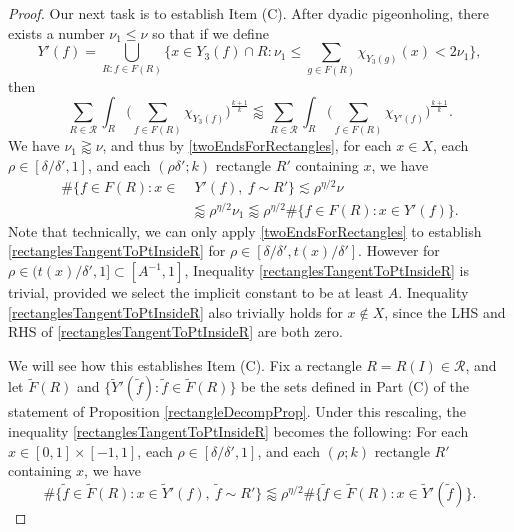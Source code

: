 \documentclass[letterpaper, reqno,11pt]{article}
\numberwithin{equation}{section}
\numberwithin{thm}{section}
\theoremstyle{remark}
\begin{document}
\begin{proof}
%

\medskip

 Our next task is to establish Item (C). After dyadic pigeonholing, there exists a number $\nu_1\leq\nu$ so that if we define
\[
Y'(f) = \bigcup_{R\colon f\in F(R)} \Big\{x\in Y_3(f) \cap R \colon \nu_1 \leq \sum_{g\in F(R)}\chi_{Y_3(g)}(x)<2\nu_1\Big\},
\]
then
\begin{equation}\label{Y2VsYp}
\sum_{R\in\mathcal{R}}\int_R\Big(\sum_{f\in F(R)}\chi_{Y_3(f)}\Big)^{\frac{k+1}{k}}\lessapprox \sum_{R\in\mathcal{R}}\int_R\Big(\sum_{f\in F(R)}\chi_{Y'(f)}\Big)^{\frac{k+1}{k}}.
\end{equation}
We have $\nu_1\gtrapprox\nu$, and thus by \eqref{twoEndsForRectangles}, for each $x\in X$, each $\rho\in [\delta/\delta', 1]$, and each $(\rho\delta'; k)$ rectangle $R'$ containing $x$, we have
\begin{equation}\label{rectanglesTangentToPtInsideR}
\begin{split}
\#\{f\in F(R)\colon x\in &\phantom{.} Y'(f),\ f\sim R'\} \lesssim \rho^{\eta/2}\nu \\
& \lessapprox  \rho^{\eta/2}\nu_1\lessapprox  \rho^{\eta/2}\#\{f\in F(R)\colon x\in Y'(f)\}.
\end{split}
\end{equation}
Note that technically, we can only apply \eqref{twoEndsForRectangles} to establish \eqref{rectanglesTangentToPtInsideR} for $\rho\in[\delta/\delta', t(x)/\delta']$. However for $\rho\in(t(x)/\delta', 1]\subset [A^{-1},1]$, Inequality \eqref{rectanglesTangentToPtInsideR} is trivial, provided we select the implicit constant to be at least $A$. Inequality \eqref{rectanglesTangentToPtInsideR} also trivially holds for $x\not\in X$, since the LHS and RHS of \eqref{rectanglesTangentToPtInsideR} are both zero.

We will see how this establishes Item (C). Fix a rectangle $R=R(I)\in\mathcal{R}$, and let $\tilde F(R)$ and $\{ \tilde Y'(\tilde f) \colon \tilde f\in \tilde F(R)\}$ be the sets defined in Part (C) of the statement of Proposition \ref{rectangleDecompProp}. Under this rescaling, the inequality \eqref{rectanglesTangentToPtInsideR} becomes the following: For each $x\in [0,1]\times[-1,1]$, each $\rho\in [\delta/\delta', 1]$, and each $(\rho; k)$ rectangle $R'$ containing $x$, we have
\begin{equation}\label{rectanglesTangentToPtInsideRRescaled}
\#\{\tilde f\in \tilde F(R)\colon x\in \tilde Y'(f),\ \tilde f\sim R'\} \lessapprox \rho^{\eta/2}\#\{\tilde f\in \tilde F(R)\colon x\in \tilde Y'(\tilde f)\}.
\end{equation}


\end{proof}
\end{document}
